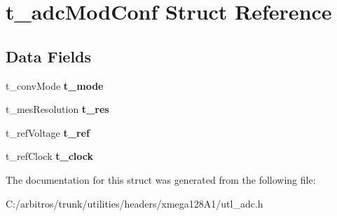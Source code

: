 \hypertarget{structt__adc_mod_conf}{\section{t\-\_\-adc\-Mod\-Conf Struct Reference}
\label{structt__adc_mod_conf}
}
\subsection*{Data Fields}
\begin{DoxyCompactItemize}
\item 
\hypertarget{structt__adc_mod_conf_aa15f0849345837f8f5a2b3acea398315}{t\-\_\-conv\-Mode {\bfseries t\-\_\-mode}}\label{structt__adc_mod_conf_aa15f0849345837f8f5a2b3acea398315}

\item 
\hypertarget{structt__adc_mod_conf_a24a483c3b37199a23881efb390da0a1f}{t\-\_\-mes\-Resolution {\bfseries t\-\_\-res}}\label{structt__adc_mod_conf_a24a483c3b37199a23881efb390da0a1f}

\item 
\hypertarget{structt__adc_mod_conf_ab1afe935ff844b12f7a1bff1a0d562b6}{t\-\_\-ref\-Voltage {\bfseries t\-\_\-ref}}\label{structt__adc_mod_conf_ab1afe935ff844b12f7a1bff1a0d562b6}

\item 
\hypertarget{structt__adc_mod_conf_ade8770475a77e637a3db85be06757c6c}{t\-\_\-ref\-Clock {\bfseries t\-\_\-clock}}\label{structt__adc_mod_conf_ade8770475a77e637a3db85be06757c6c}

\end{DoxyCompactItemize}


The documentation for this struct was generated from the following file\-:\begin{DoxyCompactItemize}
\item 
C\-:/arbitros/trunk/utilities/headers/xmega128\-A1/utl\-\_\-adc.\-h\end{DoxyCompactItemize}
